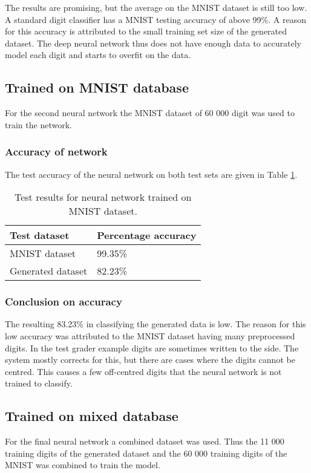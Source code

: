 The results are promising, but the average on the MNIST dataset is still too low. A standard digit classifier has a MNIST testing accuracy of above 99\%. A reason for this accuracy is attributed to the small training set size of the generated dataset. The deep neural network thus does not have enough data to accurately model each digit and starts to overfit on the data.

\subsection{Trained on MNIST database}
For the second neural network the MNIST dataset of 60 000 digit was used to train the network.

\subsubsection{Accuracy of network}
The test accuracy of the neural network on both test sets are given in Table \ref{tbl:nnResult2}.

\begin{table}
\caption{Test results for neural network trained on MNIST dataset.} \label{tbl:nnResult2}
  \centering
\begin{tabular}{|p{4cm}|p{5cm}|}
\hline
\textbf{Test dataset}&\textbf{Percentage accuracy}\\
\hline
MNIST dataset&99.35\%\\
\hline
Generated dataset&82.23\%\\
\hline
\end{tabular}
\end{table}

\subsubsection{Conclusion on accuracy}

The resulting 83.23\% in classifying the generated data is low. The reason for this low accuracy was attributed to the MNIST dataset having many preprocessed digits. In the test grader example digits are sometimes written to the side. The system mostly corrects for this, but there are cases where the digits cannot be centred. This causes a few off-centred digits that the neural network is not trained to classify.

\subsection{Trained on mixed database}
For the final neural network a combined dataset was used. Thus the 11 000 training digits of the generated dataset and the 60 000 training digits of the MNIST was combined to train the model.


